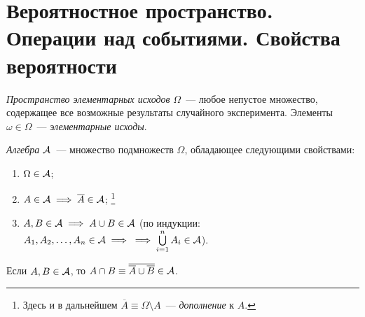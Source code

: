 \section{Вероятностное пространство. Операции над событиями. Свойства вероятности}
\begin{defn}
	\textit{Пространство элементарных исходов} $\Omega$~--- любое непустое множество, содержащее все возможные результаты случайного эксперимента.
	Элементы $\omega \in \Omega$~--- \textit{элементарные исходы}.
\end{defn}

\begin{defn}
	\textit{Алгебра} $\mathcal{A}$~--- множество подмножеств $\Omega$, обладающее следующими свойствами:
	
	\begin{enumerate}
		\item 
		      $\Omega \in \mathcal{A}$;
		\item 
		      $A \in \mathcal{A} \implies \overline{A} \in \mathcal{A}$; \footnote{Здесь и в дальнейшем $\overline{A} \equiv \Omega \setminus A$~--- \textit{дополнение} к $A$.}
		\item 
		      $A, B \in \mathcal{A} \implies A \cup B \in \mathcal{A}$ 
		      (по индукции: $A_1, A_2, \ldots, A_n \in \mathcal{A} \implies \\ \implies \bigcup\limits_{i=1}^n A_i \in \mathcal{A}$).
	\end{enumerate}
\end{defn}

\begin{rmrk}
	Если $A, B \in \mathcal{A}$, то $A \cap B \equiv \overline{\overline{A} \cup \overline{B}} \in \mathcal{A}$.
\end{rmrk}

